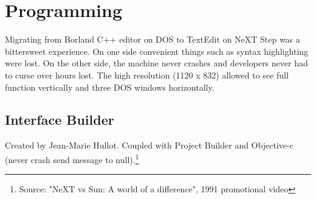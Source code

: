
\section{Programming}
Migrating from Borland C++ editor on DOS to TextEdit on NeXT Step was a bittersweet experience. On one side convenient things such as syntax highlighting were lost. On the other side, the machine never crashes and developers never had to curse over hours lost. The high resolution (1120 x 832) allowed to see full function vertically and three DOS windows horizontally. \\
\par
{}
\par
{}

\subsection{Interface Builder}
Created by Jean-Marie Hullot. Coupled with Project Builder and Objective-c (never crash send message to null).\footnote{Source: "NeXT vs Sun: A world of a difference", 1991 promotional video}
